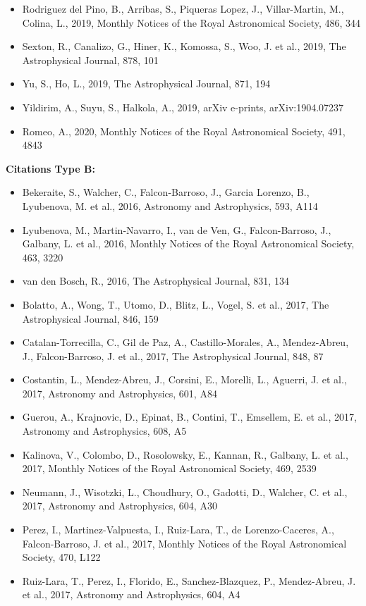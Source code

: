 \documentclass{letter}
\begin{document}
\begin{enumerate}
\begin{itemize}
\item Rodriguez del Pino, B., Arribas, S., Piqueras Lopez, J., Villar-Martin, M., Colina, L., 2019, Monthly Notices of the Royal Astronomical Society, 486, 344
\item Sexton, R., Canalizo, G., Hiner, K., Komossa, S., Woo, J. et al., 2019, The Astrophysical Journal, 878, 101
\item Yu, S., Ho, L., 2019, The Astrophysical Journal, 871, 194
\item Yildirim, A., Suyu, S., Halkola, A., 2019, arXiv e-prints, arXiv:1904.07237
\item Romeo, A., 2020, Monthly Notices of the Royal Astronomical Society, 491, 4843
\end{itemize}
{\bf Citations Type B:}
\begin{itemize}
\item Bekeraite, S., Walcher, C., Falcon-Barroso, J., Garcia Lorenzo, B., Lyubenova, M. et al., 2016, Astronomy and Astrophysics, 593, A114
\item Lyubenova, M., Martin-Navarro, I., van de Ven, G., Falcon-Barroso, J., Galbany, L. et al., 2016, Monthly Notices of the Royal Astronomical Society, 463, 3220
\item van den Bosch, R., 2016, The Astrophysical Journal, 831, 134
\item Bolatto, A., Wong, T., Utomo, D., Blitz, L., Vogel, S. et al., 2017, The Astrophysical Journal, 846, 159
\item Catalan-Torrecilla, C., Gil de Paz, A., Castillo-Morales, A., Mendez-Abreu, J., Falcon-Barroso, J. et al., 2017, The Astrophysical Journal, 848, 87
\item Costantin, L., Mendez-Abreu, J., Corsini, E., Morelli, L., Aguerri, J. et al., 2017, Astronomy and Astrophysics, 601, A84
\item Guerou, A., Krajnovic, D., Epinat, B., Contini, T., Emsellem, E. et al., 2017, Astronomy and Astrophysics, 608, A5
\item Kalinova, V., Colombo, D., Rosolowsky, E., Kannan, R., Galbany, L. et al., 2017, Monthly Notices of the Royal Astronomical Society, 469, 2539
\item Neumann, J., Wisotzki, L., Choudhury, O., Gadotti, D., Walcher, C. et al., 2017, Astronomy and Astrophysics, 604, A30
\item Perez, I., Martinez-Valpuesta, I., Ruiz-Lara, T., de Lorenzo-Caceres, A., Falcon-Barroso, J. et al., 2017, Monthly Notices of the Royal Astronomical Society, 470, L122
\item Ruiz-Lara, T., Perez, I., Florido, E., Sanchez-Blazquez, P., Mendez-Abreu, J. et al., 2017, Astronomy and Astrophysics, 604, A4

\end{itemize}
\end{enumerate}
\end{document}
